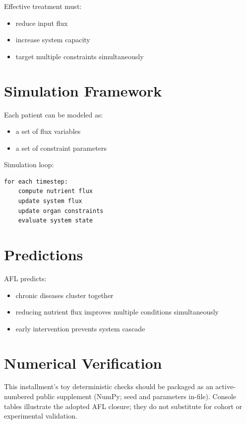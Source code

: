 \documentclass[11pt]{article}
\begin{document}
Effective treatment must:

\begin{itemize}
    \item reduce input flux
    \item increase system capacity
    \item target multiple constraints simultaneously
\end{itemize}

\section{Simulation Framework}

Each patient can be modeled as:

\begin{itemize}
    \item a set of flux variables
    \item a set of constraint parameters
\end{itemize}

Simulation loop:

\begin{verbatim}
for each timestep:
    compute nutrient flux
    update system flux
    update organ constraints
    evaluate system state
\end{verbatim}

\section{Predictions}

AFL predicts:

\begin{itemize}
    \item chronic diseases cluster together
    \item reducing nutrient flux improves multiple conditions simultaneously
    \item early intervention prevents system cascade
\end{itemize}

\section{Numerical Verification}
This installment's toy deterministic checks should be packaged as an active-numbered public supplement (NumPy; seed and parameters in-file). Console tables illustrate the adopted AFL closure; they do not substitute for cohort or experimental validation.
\end{document}
